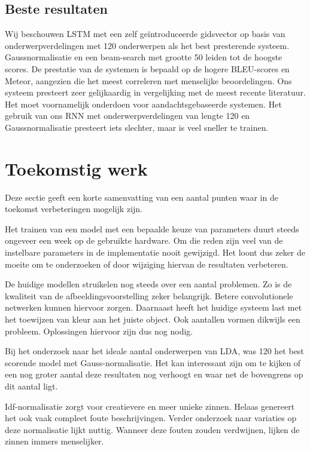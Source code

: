 \subsection{Beste resultaten}
Wij beschouwen LSTM met een zelf ge\"introduceerde gidsvector op basis van onderwerpverdelingen met 120 onderwerpen als het best presterende systeem. Gaussnormalisatie en een beam-search met grootte 50 leiden tot de hoogste scores.  De prestatie van de systemen is bepaald op de hogere BLEU-scores en Meteor, aangezien die het meest correleren met menselijke beoordelingen. Ons systeem presteert zeer gelijkaardig in vergelijking met de meest recente literatuur. Het moet voornamelijk onderdoen voor aandachtsgebaseerde systemen. Het gebruik van ons RNN met onderwerpverdelingen van lengte 120 en Gaussnormalisatie presteert iets slechter, maar is veel sneller te trainen.

\section{Toekomstig werk}
Deze sectie geeft een korte samenvatting van een aantal punten waar in de toekomst verbeteringen mogelijk zijn.

Het trainen van een model met een bepaalde keuze van parameters duurt steeds ongeveer een week op de gebruikte hardware. Om die reden zijn veel van de instelbare parameters in de implementatie nooit gewijzigd. Het loont dus zeker de moeite om te onderzoeken of door wijziging hiervan de resultaten verbeteren.

De huidige modellen struikelen nog steeds over een aantal problemen. Zo is de kwaliteit van de afbeeldingsvoorstelling zeker belangrijk. Betere convolutionele netwerken kunnen hiervoor zorgen. Daarnaast heeft het huidige systeem last met het toewijzen van kleur aan het juiste object. Ook aantallen vormen dikwijls een probleem. Oplossingen hiervoor zijn dus nog nodig.

Bij het onderzoek naar het ideale aantal onderwerpen van LDA, was 120 het best scorende model met Gauss-normalisatie. Het kan interessant zijn om te kijken of een nog groter aantal deze resultaten nog verhoogt en waar net de bovengrens op dit aantal ligt.

Idf-normalisatie zorgt voor creatievere en meer unieke zinnen. Helaas genereert het ook vaak compleet foute beschrijvingen. 
Verder onderzoek naar variaties op deze normalisatie lijkt nuttig. Wanneer deze fouten zouden verdwijnen, lijken de zinnen immers menselijker.

